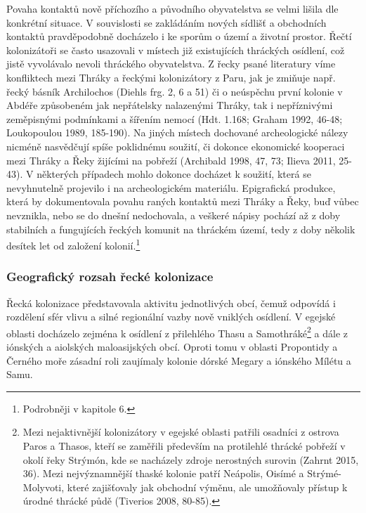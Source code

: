 Povaha kontaktů nově příchozího a původního obyvatelstva se velmi lišila dle konkrétní situace. V souvislosti se zakládáním nových sídlišť a obchodních kontaktů pravděpodobně docházelo i ke sporům o území a životní prostor. Řečtí kolonizátoři se často usazovali v místech již existujících thráckých osídlení, což jistě vyvolávalo nevoli thráckého obyvatelstva. Z řecky psané literatury víme konfliktech mezi Thráky a řeckými kolonizátory z Paru, jak je zmiňuje např. řecký básník Archilochos (Diehls frg. 2, 6 a 51) či o neúspěchu první kolonie v Abdéře způsobeném jak nepřátelsky nalazenými Thráky, tak i nepříznivými zeměpisnými podmínkami a šířením nemocí (Hdt. 1.168; Graham 1992, 46-48; Loukopoulou 1989, 185-190). Na jiných místech dochované archeologické nálezy nicméně nasvědčují spíše poklidnému soužití, či dokonce ekonomické kooperaci mezi Thráky a Řeky žijícími na pobřeží (Archibald 1998, 47, 73; Ilieva 2011, 25-43). V některých případech mohlo dokonce docházet k soužití, která se nevyhnutelně projevilo i na archeologickém materiálu. Epigrafická produkce, která by dokumentovala povahu raných kontaktů mezi Thráky a Řeky, buď vůbec nevznikla, nebo se do dnešní nedochovala, a veškeré nápisy pochází až z doby stabilních a fungujících řeckých komunit na thráckém území, tedy z doby několik desítek let od založení kolonií.\footnote{Podrobněji v kapitole 6.}

\subsubsection[geografický-rozsah-řecké-kolonizace]{Geografický rozsah řecké kolonizace}

Řecká kolonizace představovala aktivitu jednotlivých obcí, čemuž odpovídá i rozdělení sfér vlivu a silné regionální vazby nově vniklých osídlení. V egejské oblasti docházelo zejména k osídlení z přilehlého Thasu a Samothráké\footnote{Mezi nejaktivnější kolonizátory v egejské oblasti patřili osadníci z ostrova Paros a Thasos, kteří se zaměřili především na protilehlé thrácké pobřeží v okolí řeky Strýmón, kde se nacházely zdroje nerostných surovin (Zahrnt 2015, 36). Mezi nejvýznamnější thaské kolonie patří Neápolis, Oisímé a Strýmé-Molyvoti, které zajišťovaly jak obchodní výměnu, ale umožňovaly přístup k úrodné thrácké půdě (Tiverios 2008, 80-85).} a dále z iónských a aiolských maloasijských obcí. Oproti tomu v oblasti Propontidy a Černého moře zásadní roli zaujímaly kolonie dórské Megary a iónského Mílétu a Samu.

